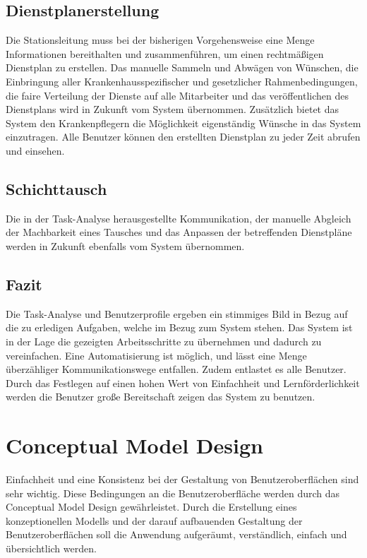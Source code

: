 \documentclass[11pt,
paper=a4,
bibtotocnumbered,	  %
liststotocnumbered,  %
DIV=calc,		  %
tablecaptionabove,	  %
headinclude,
]{article}
\begin{document}
\subsection{Dienstplanerstellung}
Die Stationsleitung muss bei der bisherigen Vorgehensweise eine Menge Informationen bereithalten und zusammenführen, um einen rechtmäßigen Dienstplan zu erstellen. Das manuelle Sammeln und Abwägen von Wünschen, die Einbringung aller Krankenhausspezifischer und gesetzlicher Rahmenbedingungen, die faire Verteilung der Dienste auf alle Mitarbeiter und das veröffentlichen des Dienstplans wird in Zukunft vom System übernommen. Zusätzlich bietet das System den Krankenpflegern die Möglichkeit eigenständig Wünsche in das System einzutragen. Alle Benutzer können den erstellten Dienstplan zu jeder Zeit abrufen und einsehen.
\subsection{Schichttausch}
Die in der Task-Analyse herausgestellte Kommunikation, der manuelle Abgleich der Machbarkeit eines Tausches und das Anpassen der betreffenden Dienstpläne werden in Zukunft ebenfalls vom System übernommen.
\subsection{Fazit}
Die Task-Analyse und Benutzerprofile ergeben ein stimmiges Bild in Bezug auf die zu erledigen Aufgaben, welche im Bezug zum System stehen. Das System ist in der Lage die gezeigten Arbeitsschritte zu übernehmen und dadurch zu vereinfachen. Eine Automatisierung ist möglich, und lässt eine Menge überzähliger Kommunikationswege entfallen. Zudem entlastet es alle Benutzer. Durch das Festlegen auf einen hohen Wert von Einfachheit und Lernförderlichkeit werden die Benutzer große Bereitschaft zeigen das System zu benutzen.
\section{Conceptual Model Design}
Einfachheit und eine Konsistenz bei der Gestaltung von Benutzeroberflächen sind sehr wichtig. Diese Bedingungen an die Benutzeroberfläche werden durch das Conceptual Model Design gewährleistet. Durch die Erstellung eines konzeptionellen Modells und der darauf aufbauenden Gestaltung der Benutzeroberflächen soll die Anwendung aufgeräumt, verständlich, einfach und übersichtlich werden.
\end{document}
